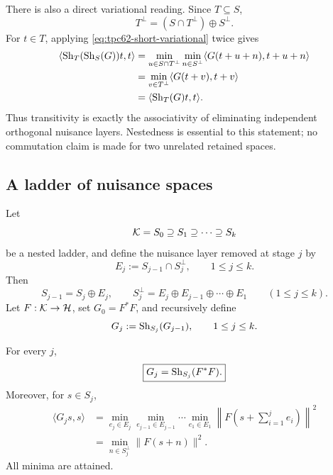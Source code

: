 There is also a direct variational reading.  Since \(T\subseteq S\),
\begin{equation}
 T^\perp=(S\cap T^\perp)\oplus S^\perp.
 \label{eq:tpc62-nested-complement-decomposition}
\end{equation}
For \(t\in T\), applying \eqref{eq:tpc62-short-variational} twice gives
\begin{align}
 \left\langle\operatorname{Sh}_T(\operatorname{Sh}_S(G))t,t\right\rangle
 &=\min_{u\in S\cap T^\perp}
   \min_{n\in S^\perp}
   \langle G(t+u+n),t+u+n\rangle
 \notag\\
 &=\min_{v\in T^\perp}
   \langle G(t+v),t+v\rangle
 \notag\\
 &=\langle\operatorname{Sh}_T(G)t,t\rangle.
 \label{eq:tpc62-transitivity-variational}
\end{align}
Thus transitivity is exactly the associativity of eliminating independent
orthogonal nuisance layers.  Nestedness is essential to this statement;
no commutation claim is made for two unrelated retained spaces.

\subsection{A ladder of nuisance spaces}

Let
\begin{equation}
 \mathcal K=S_0\supseteq S_1\supseteq\cdots\supseteq S_k
 \label{eq:tpc62-retained-ladder}
\end{equation}
be a nested ladder, and define the nuisance layer removed at stage \(j\)
by
\begin{equation}
 E_j:=S_{j-1}\cap S_j^\perp,
 \qquad 1\le j\le k.
 \label{eq:tpc62-nuisance-layers}
\end{equation}
Then
\begin{equation}
 S_{j-1}=S_j\oplus E_j,
 \qquad
 S_j^\perp=E_j\oplus E_{j-1}\oplus\cdots\oplus E_1
 \qquad(1\le j\le k).
 \label{eq:tpc62-ladder-orthogonal-decomposition}
\end{equation}
Let \(F:\mathcal K\to\mathcal H\), set \(G_0=F^*F\), and recursively define
\begin{equation}
 G_j:=\operatorname{Sh}_{S_j}(G_{j-1}),
 \qquad 1\le j\le k.
 \label{eq:tpc62-sequential-shorts}
\end{equation}

\begin{theorem}
\label{thm:tpc62-sequential-equals-direct}
For every \(j\),
\begin{equation}
 \boxed{G_j=\operatorname{Sh}_{S_j}(F^*F).}
 \label{eq:tpc62-sequential-direct-operator}
\end{equation}
Moreover, for \(s\in S_j\),
\begin{align}
 \langle G_js,s\rangle
 &=\min_{e_j\in E_j}\min_{e_{j-1}\in E_{j-1}}
   \cdots\min_{e_1\in E_1}
   \left\|F\!\left(s+\sum_{i=1}^j e_i\right)\right\|^2
 \label{eq:tpc62-sequential-nuisance-formula}\\
 &=\min_{n\in S_j^\perp}\|F(s+n)\|^2.
 \label{eq:tpc62-one-shot-nuisance-formula}
\end{align}
All minima are attained.
\end{theorem}

